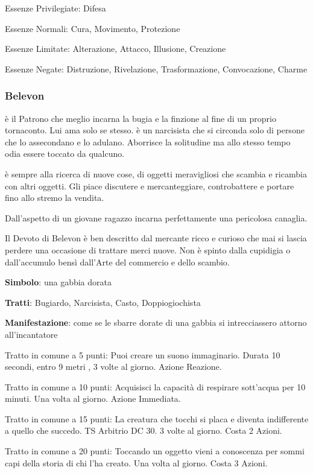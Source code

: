 \documentclass[a4paper,11pt,twoside,openany]{book}
\begin{document}
{Essenze Privilegiate: Difesa

Essenze Normali: Cura, Movimento, Protezione

Essenze Limitate: Alterazione, Attacco, Illusione, Creazione

Essenze Negate: Distruzione, Rivelazione, Trasformazione, Convocazione, Charme

\subsubsection{Belevon}

\label{belevon}

è il Patrono che meglio incarna la bugia e la finzione al fine di un proprio tornaconto. Lui ama solo se stesso. è un narcisista che si circonda solo di persone che lo assecondano e lo adulano. Aborrisce la solitudine ma allo stesso tempo odia essere toccato da qualcuno.

è sempre alla ricerca di nuove cose, di oggetti meravigliosi che scambia e ricambia con altri oggetti. Gli piace discutere e mercanteggiare, controbattere e portare fino allo stremo la vendita.

Dall'aspetto di un giovane ragazzo incarna perfettamente una pericolosa canaglia.

Il Devoto di Belevon è ben descritto dal mercante ricco e curioso che mai si lascia perdere una occasione di trattare merci nuove. Non è spinto dalla cupidigia o dall'accumulo bensì dall'Arte del commercio e dello scambio.

\textbf{Simbolo}: una gabbia dorata

\textbf{Tratti}: Bugiardo, Narcisista, Casto, Doppiogiochista

\textbf{Manifestazione}: come se le sbarre dorate di una gabbia si intrecciassero attorno all'incantatore

\bigskip

Tratto in comune a 5 punti: Puoi creare un suono immaginario. Durata 10 secondi, entro 9 metri , 3 volte al giorno. Azione Reazione.

Tratto in comune a 10 punti: Acquisisci la capacità di respirare sott'acqua per 10 minuti. Una volta al giorno. Azione Immediata.

Tratto in comune a 15 punti: La creatura che tocchi si placa e diventa indifferente a quello che succedo. TS Arbitrio DC 30. 3 volte al giorno. Costa 2 Azioni.

Tratto in comune a 20 punti: Toccando un oggetto vieni a conoscenza per sommi capi della storia di chi l'ha creato. Una volta al giorno. Costa 3 Azioni.

}
\end{document}
